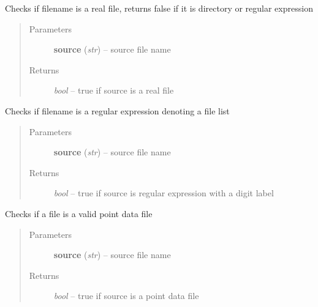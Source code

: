 \documentclass[letterpaper,10pt,english]{sphinxmanual}
\begin{document}
\begin{fulllineitems}
\label{api/ClearMap.IO:ClearMap.IO.IO.isFile}
Checks if filename is a real file, returns false if it is directory or regular expression
\begin{quote}\begin{description}
\item[{Parameters}] \leavevmode
\textbf{source} (\emph{str}) --
source file name

\item[{Returns}] \leavevmode
\emph{bool} --
true if source is a real file

\end{description}\end{quote}

\end{fulllineitems}


\begin{fulllineitems}
\label{api/ClearMap.IO:ClearMap.IO.IO.isFileExpression}
Checks if filename is a regular expression denoting a file list
\begin{quote}\begin{description}
\item[{Parameters}] \leavevmode
\textbf{source} (\emph{str}) --
source file name

\item[{Returns}] \leavevmode
\emph{bool} --
true if source is regular expression with a digit label

\end{description}\end{quote}

\end{fulllineitems}


\begin{fulllineitems}
\label{api/ClearMap.IO:ClearMap.IO.IO.isPointFile}
Checks if a file is a valid point data file
\begin{quote}\begin{description}
\item[{Parameters}] \leavevmode
\textbf{source} (\emph{str}) --
source file name

\item[{Returns}] \leavevmode
\emph{bool} --
true if source is a point data file

\end{description}\end{quote}

\end{fulllineitems}
\end{document}
